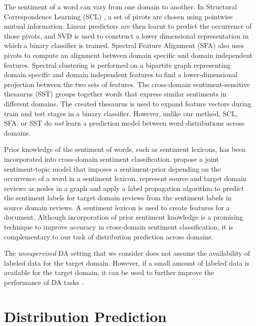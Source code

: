 \documentclass[11pt]{article}
\begin{document}
The sentiment of a word can vary from one domain to another.
In Structural Correspondence Learning (SCL) \cite{Blitzer:EMNLP:2006,Blitzer:ACL:2007},
a set of pivots are chosen using pointwise mutual information. 
Linear predictors are then learnt to predict the occurrence of those pivots, and SVD
is used to construct a lower dimensional representation in which a binary classifier is trained.
Spectral Feature Alignment (SFA) \cite{Pan:WWW:2010} also uses pivots to compute an alignment between
domain specific and domain independent features. Spectral clustering is performed on a bipartite
graph representing domain specific and domain independent features to find a lower-dimensional 
projection between the two sets of features. 
The cross-domain sentiment-sensitive thesaurus (SST) \cite{Bollegala:ACL:2011} 
groups together words that express similar sentiments in different domains. The created thesaurus is used
to expand feature vectors during train and test stages in a binary classifier.
However, unlike our method, SCL, SFA, or SST do \textit{not} learn a prediction model between
word distributions across domains.

Prior knowledge of the sentiment of words, such as sentiment lexicons,
has been  incorporated into cross-domain sentiment classification.
 propose a joint sentiment-topic model that imposes a sentiment-prior
depending on the occurrence of a word in a sentiment lexicon. 
 represent source and target domain reviews as nodes in a graph
and apply a label propagation algorithm to predict the sentiment labels for target domain
reviews from the sentiment labels in source domain reviews. A sentiment lexicon is used
to create features for a document. Although incorporation of prior sentiment knowledge is
a promising technique to improve accuracy in cross-domain sentiment classification,
it is complementary to our task of distribution prediction across domains.

The \textit{unsupervised} DA setting that we consider does not assume
the availability of labeled data for the target domain. However, if a small amount of labeled data
is available for the target domain, it can be used to further improve the performance of DA
tasks \cite{xiao-zhao-guo:2013:EMNLP,Daume:ACL:2007}.

\section{Distribution Prediction}
\label{sec:method}
\end{document}
